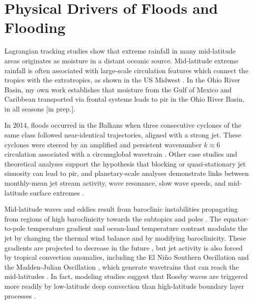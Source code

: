 \documentclass[11pt]{article}
\begin{document}
\section{Physical Drivers of Floods and Flooding}

Lagrangian tracking studies \citep{Gimeno2010} show that extreme rainfall in many mid-latitude areas originates as moisture in a distant oceanic source.
Mid-latitude extreme rainfall is often associated with large-scale circulation features which connect the tropics with the extratropics, as shown in the US Midwest \citep{Dirmeyer2010}.
In the Ohio River Basin, my own work establishes that moisture from the Gulf of Mexico and Caribbean transported via frontal systems leads to {pir} in the Ohio River Basin, in all seasons [in prep.].

In 2014, floods occurred in the Balkans when three consecutive cyclones of the same class followed near-identical trajectories, aligned with a strong jet.
These cyclones were steered by an amplified and persistent wavenumber $k \approx 6$ circulation \citep{Stadtherr2016} associated with a circumglobal wavetrain \citep{Branstator2002}.
Other case studies \citep{Grams2014,Nakamura2012} and theoretical analyses \citep{Hoskins2015} support the hypothesis that blocking or quasi-stationary jet sinuosity can lead to {pir}, and planetary-scale analyses demonstrate links between monthly-mean jet stream activity, wave resonance, slow wave speeds,  and mid-latitude surface extremes \citep{Screen2014,Coumou2014}.

Mid-latitude waves and eddies result from baroclinic instabilities propagating from regions of high baroclinicity towards the subtopics and poles \citep{Shaw2016}.
The equator-to-pole temperature gradient and ocean-land temperature contrast modulate the jet by changing the thermal wind balance and by modifying baroclinicity.
These gradients are projected to decrease in the future \citep{Cohen2014}, but jet activity is also forced by tropical convection anomalies, including the El Ni\~{n}o Southern Oscillation and the Madden-Julian Oscillation \citep{Karamperidou2012}, which generate wavetrains that can reach the mid-latitudes \citep{Roundy2012}.
In fact, modeling studies suggest that Rossby waves are triggered more readily by low-latitude deep convection than high-latitude boundary layer processes \citep{Hoskins1981}.
\end{document}
